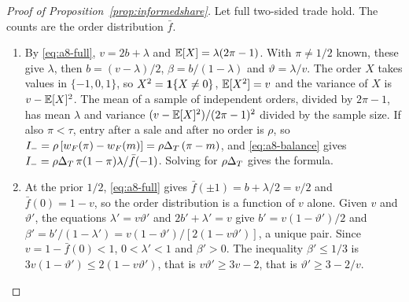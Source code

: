 \begin{proof}[Proof of Proposition~\ref{prop:informedshare}]
Let full two-sided trade hold. The counts are the order distribution \(\bar f\).
\begin{enumerate}[label=(\alph*),leftmargin=2em]
\item By \eqref{eq:a8-full}, \(v=2b+\lambda\) and \(\mathbb{E}[X]=\lambda(2\pi-1)\). With \(\pi\ne1/2\) known, these give
\(\lambda\), then \(b=(v-\lambda)/2\), \(\beta=b/(1-\lambda)\) and \(\vartheta=\lambda/v\). The order \(X\) takes values in
\(\{-1,0,1\}\), so \(X^2=\mathbf{1}\{X\ne0\}\), \(\mathbb{E}[X^2]=v\) and the variance of \(X\) is \(v-\mathbb{E}[X]^2\). The mean of a sample of
independent orders, divided by \(2\pi-1\), has mean \(\lambda\) and variance \((v-\mathbb{E}[X]^2)/(2\pi-1)^2\) divided by the
sample size. If also
\(\pi<\tau\), entry after a sale and after no order is \(\rho\), so \(I_-=\rho\,[w_F(\pi)-w_F(m)]=\rho\Delta_T\,(\pi-m)\), and
\eqref{eq:a8-balance} gives \(I_-=\rho\Delta_T\,\pi(1-\pi)\lambda/\bar f(-1)\). Solving for \(\rho\Delta_T\) gives the formula.
\item At the prior \(1/2\), \eqref{eq:a8-full} gives \(\bar f(\pm1)=b+\lambda/2=v/2\) and \(\bar f(0)=1-v\), so the order
distribution is a function of \(v\) alone. Given \(v\) and \(\vartheta'\), the equations \(\lambda'=v\vartheta'\) and
\(2b'+\lambda'=v\) give \(b'=v(1-\vartheta')/2\) and \(\beta'=b'/(1-\lambda')=v(1-\vartheta')/[2(1-v\vartheta')]\), a unique
pair. Since \(v=1-\bar f(0)<1\), \(0<\lambda'<1\) and \(\beta'>0\). The inequality \(\beta'\le1/3\) is
\(3v(1-\vartheta')\le2(1-v\vartheta')\), that is \(v\vartheta'\ge3v-2\), that is \(\vartheta'\ge3-2/v\).


\end{enumerate}
\end{proof}
